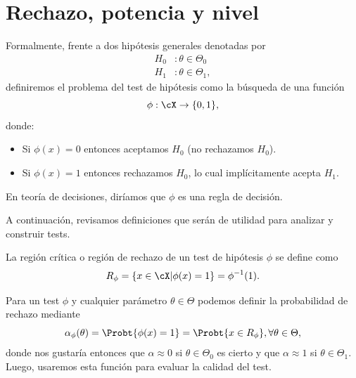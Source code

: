

\section{Rechazo, potencia y nivel} 
\label{sec:def_hipótesis}

Formalmente, frente a dos hipótesis generales denotadas por 
\begin{align}
	H_0&: \theta\in\Theta_0\\
	H_1&: \theta\in\Theta_1,
\end{align}
definiremos el problema del test de hipótesis como la búsqueda de una función
\begin{equation}
	\phi:\cX\rightarrow \{0,1\},
\end{equation}
donde:
\begin{itemize}
	\item Si $\phi(x)=0$ entonces aceptamos $H_0$ (no rechazamos $H_0$).
	\item Si $\phi(x)=1$ entonces rechazamos $H_0$, lo cual implícitamente acepta $H_1$. 
\end{itemize}
En teoría de decisiones, diríamos que $\phi$ es una regla de decisión. 

A continuación, revisamos definiciones que serán de utilidad para analizar y construir tests. 

\begin{definition}
	La región crítica o región de rechazo de un test de hipótesis $\phi$ se define como 
	\begin{equation}
		R_\phi = \{x\in\cX | \phi(x)=1\} = \phi^{-1}(1).
	\end{equation}
	
\end{definition}



\begin{definition}
Para un test $\phi$ y cualquier parámetro $\theta\in\Theta$ podemos definir la probabilidad de rechazo mediante
\begin{equation}
 	\alpha_\phi(\theta) = \Probt{\phi(x)=1} = \Probt{x\in R_\phi}, \forall\theta\in\Theta,
 \end{equation}
donde nos gustaría entonces que $\alpha\approx 0$ si $\theta\in\Theta_0$ es cierto y que $\alpha\approx 1$ si $\theta\in\Theta_1$. Luego, usaremos esta función para evaluar la calidad del test.
\end{definition}


